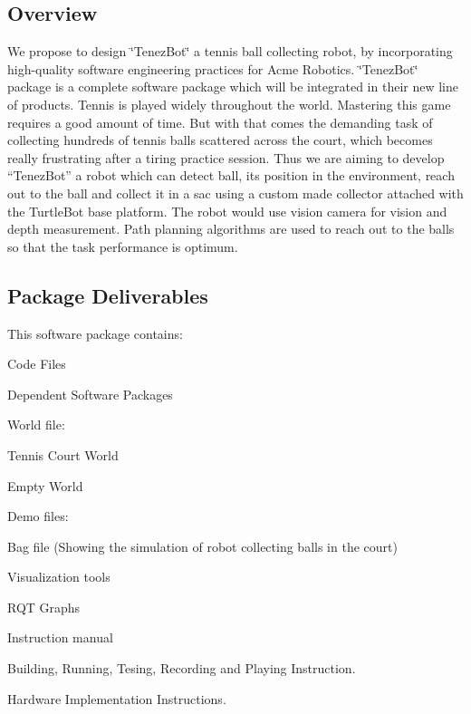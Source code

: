 \href{https://travis-ci.org/Pruthvi-Sanghavi/TenezBot}{\tt } \href{https://opensource.org/licenses/BSD-3-Clause}{\tt } \href{https://coveralls.io/github/Pruthvi-Sanghavi/TenezBot?branch=master}{\tt }

\subsection*{Overview}

We propose to design \char`\"{}\+Tenez\+Bot\char`\"{} a tennis ball collecting robot, by incorporating high-\/quality software engineering practices for Acme Robotics. \char`\"{}\+Tenez\+Bot\char`\"{} package is a complete software package which will be integrated in their new line of products. Tennis is played widely throughout the world. Mastering this game requires a good amount of time. But with that comes the demanding task of collecting hundreds of tennis balls scattered across the court, which becomes really frustrating after a tiring practice session. Thus we are aiming to develop “\+Tenez\+Bot” a robot which can detect ball, its position in the environment, reach out to the ball and collect it in a sac using a custom made collector attached with the Turtle\+Bot base platform. The robot would use vision camera for vision and depth measurement. Path planning algorithms are used to reach out to the balls so that the task performance is optimum.

\subsection*{Package Deliverables}

This software package contains\+:


\begin{DoxyEnumerate}
\item Code Files
\item Dependent Software Packages
\item World file\+:
\begin{DoxyEnumerate}
\item Tennis Court World
\item Empty World
\end{DoxyEnumerate}
\item Demo files\+:
\begin{DoxyEnumerate}
\item Bag file (Showing the simulation of robot collecting balls in the court)
\item Visualization tools
\item R\+QT Graphs
\end{DoxyEnumerate}
\item Instruction manual
\begin{DoxyItemize}
\item Building, Running, Tesing, Recording and Playing Instruction.
\item Hardware Implementation Instructions.
\end{DoxyItemize}
\end{DoxyEnumerate}

